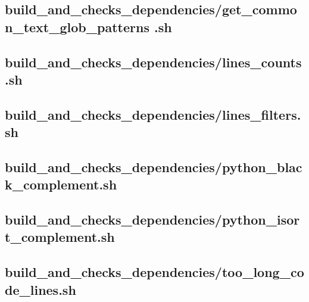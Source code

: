 \documentclass{article}
\begin{document}


\subsection{
  build\_and\_checks\_dependencies/get\_common\_text\_glob\_patterns%
.sh
}
\label{
  build_and_checks_dependencies:get_common_text_glob_patternssh
}



\subsection{
  build\_and\_checks\_dependencies/lines\_counts.sh
}
\label{
  build_and_checks_dependencies:lines_countssh
}



\subsection{
  build\_and\_checks\_dependencies/lines\_filters.sh
}
\label{
  build_and_checks_dependencies:lines_filterssh
}



\subsection{
  build\_and\_checks\_dependencies/python\_black\_complement.sh
}
\label{
  build_and_checks_dependencies:python_black_complementsh
}



\subsection{
  build\_and\_checks\_dependencies/python\_isort\_complement.sh
}
\label{
  build_and_checks_dependencies:python_isort_complementsh
}



\subsection{
  build\_and\_checks\_dependencies/too\_long\_code\_lines.sh
}
\label{
  build_and_checks_dependencies:too_long_code_linessh
}
\end{document}
